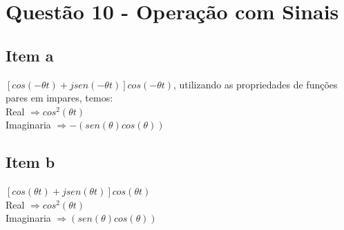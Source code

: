 \documentclass[a4paper, 12pt]{article}
\begin{document}
    \section{Quest\~{a}o 10 - Operação com Sinais}
        \subsection{Item a}
        $[cos(-\theta t) + jsen(-\theta t)]cos(-\theta t)$, utilizando as propriedades de funções pares em impares, temos: \\
        Real $\Rightarrow cos^{2}(\theta t)$ \\
        Imaginaria $\Rightarrow - (sen(\theta)cos(\theta))$
        \subsection{Item b}
        $[cos(\theta t) + jsen(\theta t)]cos(\theta t)$ \\
        Real $\Rightarrow cos^{2}(\theta t)$ \\
        Imaginaria $\Rightarrow (sen(\theta)cos(\theta))$        
\end{document}
